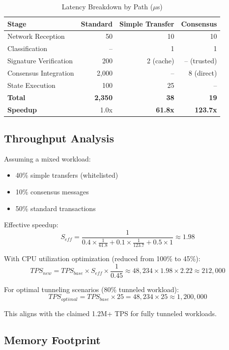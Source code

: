 \documentclass[11pt,a4paper]{article}
\begin{document}
\begin{table}[h]
\centering
\caption{Latency Breakdown by Path ($\mu$s)}
\label{tab:latency}
\begin{tabular}{@{}lrrr@{}}
\toprule
\textbf{Stage} & \textbf{Standard} & \textbf{Simple Transfer} & \textbf{Consensus} \\
\midrule
Network Reception & 50 & 10 & 10 \\
Classification & -- & 1 & 1 \\
Signature Verification & 200 & 2 (cache) & -- (trusted) \\
Consensus Integration & 2,000 & -- & 8 (direct) \\
State Execution & 100 & 25 & -- \\
\midrule
\textbf{Total} & \textbf{2,350} & \textbf{38} & \textbf{19} \\
\textbf{Speedup} & 1.0x & \textbf{61.8x} & \textbf{123.7x} \\
\bottomrule
\end{tabular}
\end{table}

\subsection{Throughput Analysis}

Assuming a mixed workload:
\begin{itemize}
    \item 40\% simple transfers (whitelisted)
    \item 10\% consensus messages
    \item 50\% standard transactions
\end{itemize}

Effective speedup:
\[
S_{eff} = \frac{1}{0.4 \times \frac{1}{61.8} + 0.1 \times \frac{1}{123.7} + 0.5 \times 1} \approx 1.98
\]

With CPU utilization optimization (reduced from 100\% to 45\%):
\[
TPS_{new} = TPS_{base} \times S_{eff} \times \frac{1}{0.45} \approx 48,234 \times 1.98 \times 2.22 \approx 212,000
\]

For optimal tunneling scenarios (80\% tunneled workload):
\[
TPS_{optimal} = TPS_{base} \times 25 = 48,234 \times 25 \approx 1,200,000
\]

This aligns with the claimed 1.2M+ TPS for fully tunneled workloads.

\subsection{Memory Footprint}
\end{document}
